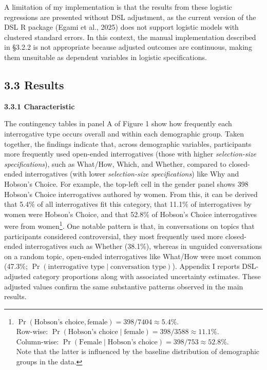 \documentclass[
  12pt,
]{article}
\begin{document}
A limitation of my implementation is that the results from these logistic regressions are presented without DSL adjustment, as the current version of the DSL R package (Egami et al., 2025) does not support logistic models with clustered standard errors. In this context, the manual implementation described in §3.2.2 is not appropriate because adjusted outcomes are continuous, making them unsuitable as dependent variables in logistic specifications.

\subsection{3.3 Results}\label{results-1}

\textbf{3.3.1 Characteristic}

The contingency tables in panel A of Figure 1 show how frequently each interrogative type occurs overall and within each demographic group. Taken together, the findings indicate that, across demographic variables, participants more frequently used open-ended interrogatives (those with higher \emph{selection-size specifications}), such as What/How, Which, and Whether, compared to closed-ended interrogatives (with lower \emph{selection-size specifications}) like Why and Hobson's Choice. For example, the top-left cell in the gender panel shows 398 Hobson's Choice interrogatives authored by women. From this, it can be derived that 5.4\% of all interrogatives fit this category, that 11.1\% of interrogatives by women were Hobson's Choice, and that 52.8\% of Hobson's Choice interrogatives were from women\footnote{\(\Pr(\text{Hobson’s choice}, \text{female}) = 398 / 7404 \approx \mathbf{5.4\%}\).\\
  Row-wise: \(\Pr(\text{Hobson’s choice} \mid \text{female}) = 398 / 3588 \approx \mathbf{11.1\%}\).\\
  Column-wise: \(\Pr(\text{Female} \mid \text{Hobson’s choice}) = 398 / 753 \approx \mathbf{52.8\%}\).\\
  Note that the latter is influenced by the baseline distribution of demographic groups in the data.}. One notable pattern is that, in conversations on topics that participants considered controversial, they most frequently used more closed-ended interrogatives such as Whether (38.1\%), whereas in unguided conversations on a random topic, open-ended interrogatives like What/How were most common (47.3\%; \(\Pr(\text{interrogative type} \mid \text{conversation type})\)). Appendix I reports DSL-adjusted category proportions along with associated uncertainty estimates. These adjusted values confirm the same substantive patterns observed in the main results.
\end{document}
